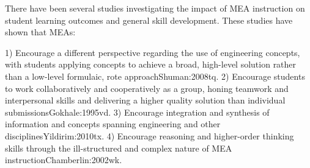 There have been several studies investigating the impact of MEA instruction on student learning outcomes and general skill development. These studies have shown that MEAs:

1)	Encourage a different perspective regarding the use of engineering concepts, with students applying concepts to achieve a broad, high-level solution rather than a low-level formulaic, rote approach{Shuman:2008tq}.
2)	Encourage students to work collaboratively and cooperatively as a group, honing teamwork and interpersonal skills and delivering a higher quality solution than individual submissions{Gokhale:1995vd}. 
3)	Encourage integration and synthesis of information and concepts spanning engineering and other disciplines{Yildirim:2010tx}.
4)	Encourage reasoning and higher-order thinking skills through the ill-structured and complex nature of MEA instruction{Chamberlin:2002wk}.

